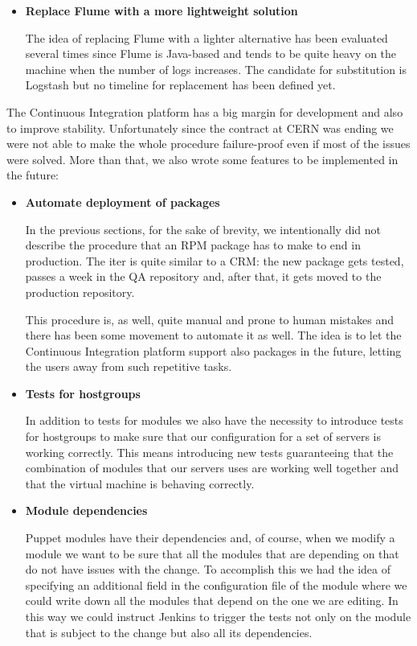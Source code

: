 \begin{itemize}
  \item \textbf{Replace Flume with a more lightweight solution}

  The idea of replacing Flume with a lighter alternative has been
  evaluated several times since Flume is Java-based and tends to be quite
  heavy on the machine when the number of logs increases. The candidate
  for substitution is Logstash but no timeline for replacement has been
  defined yet.

\end{itemize}

The Continuous Integration platform has a big margin for development and
also to improve stability. Unfortunately since the contract at CERN was
ending we were not able to make the whole procedure failure-proof even if
most of the issues were solved. More than that, we also wrote some
features to be implemented in the future:

\begin{itemize}

  \item \textbf{Automate deployment of packages}

  In the previous sections, for the sake of brevity, we intentionally did
  not describe the procedure that an RPM package has to make to end in
  production. The iter is quite similar to a CRM: the new package gets
  tested, passes a week in the QA repository and, after that, it gets
  moved to the production repository.

  This procedure is, as well, quite manual and prone to human mistakes and
  there has been some movement to automate it as well. The idea is to let
  the Continuous Integration platform support also packages in the future,
  letting the users away from such repetitive tasks.

  \item \textbf{Tests for hostgroups}

  In addition to tests for modules we also have the necessity to introduce
  tests for hostgroups to make sure that our configuration for a set of
  servers is working correctly. This means introducing new tests
  guaranteeing that the combination of modules that our servers uses are
  working well together and that the virtual machine is behaving
  correctly.

  \item \textbf{Module dependencies}

  Puppet modules have their dependencies and, of course, when we modify
  a module we want to be sure that all the modules that are depending on
  that do not have issues with the change. To accomplish this we had the
  idea of specifying an additional field in the configuration file of the
  module where we could write down all the modules that depend on the one
  we are editing. In this way we could instruct Jenkins to trigger the
  tests not only on the module that is subject to the change but also all
  its dependencies.

\end{itemize}
